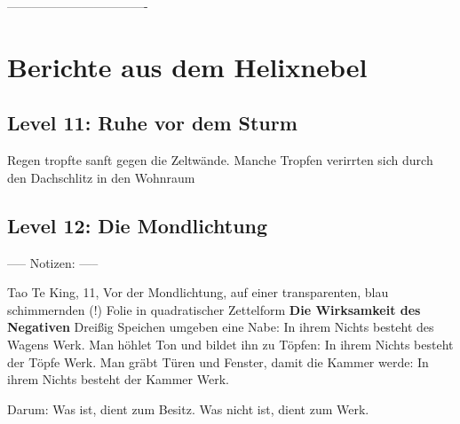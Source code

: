 %









----------------------------------


\chapter{Berichte aus dem Helixnebel}

\section{Level 11: Ruhe vor dem Sturm}

Regen tropfte sanft gegen die Zeltwände. Manche Tropfen verirrten sich durch den Dachschlitz in den Wohnraum














\section{Level 12: Die Mondlichtung}

----- Notizen: -----

Tao Te King, 11, Vor der Mondlichtung, auf einer transparenten, blau schimmernden (!) Folie in quadratischer Zettelform
\textbf{Die Wirksamkeit des Negativen}
Dreißig Speichen umgeben eine Nabe:
In ihrem Nichts besteht des Wagens Werk.
Man höhlet Ton und bildet ihn zu Töpfen:
In ihrem Nichts besteht der Töpfe Werk.
Man gräbt Türen und Fenster, damit die Kammer werde:
In ihrem Nichts besteht der Kammer Werk.

Darum: Was ist, dient zum Besitz.
Was nicht ist, dient zum Werk.

